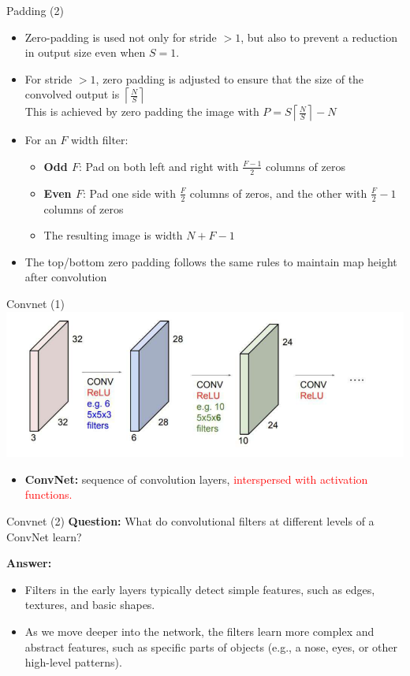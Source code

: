 \documentclass[default, aspectratio=169]{beamer}
\begin{document}
	\begin{frame}{Padding (2)}
		\begin{itemize}
			\item Zero-padding is used not only for stride $> 1$, but also to prevent a reduction in output size even when $S = 1$.
			
			\item For stride $> 1$, zero padding is adjusted to ensure that the size of the convolved output is $\left\lceil \frac{N}{S} \right\rceil$
			\\
			This is achieved by zero padding the image with  $ P = S\left\lceil \frac{N}{S} \right\rceil - N$
			
			\item For an $F$ width filter:
			\begin{itemize}
				\item \textbf{Odd $F$}: Pad on both left and right with $\frac{F-1}{2}$ columns of zeros
				\item \textbf{Even $F$}: Pad one side with $\frac{F}{2}$ columns of zeros, and the other with $\frac{F}{2} - 1$ columns of zeros
				\item The resulting image is width $N + F - 1$
			\end{itemize}
			\item The top/bottom zero padding follows the same rules to maintain map height after convolution
			
		\end{itemize}
	\end{frame}
	\begin{frame}{Convnet (1)}
		\centering
		\includegraphics[keepaspectratio, scale=0.7]{pic/convnet.png}
		\smallskip
		\begin{itemize}
			\item \textbf {ConvNet:} sequence of convolution layers, \textcolor{red}{interspersed with activation functions.}
		\end{itemize}
	\end{frame}
	\begin{frame}{Convnet (2)}
		\textbf{Question:}
		What do convolutional filters at different levels of a ConvNet learn?
		
		\bigskip
		
		\textbf{Answer:} 
		\begin{itemize}
			\item Filters in the early layers typically detect simple features, such as edges, textures, and basic shapes.
			\item As we move deeper into the network, the filters learn more complex and abstract features, such as specific parts of objects (e.g., a nose, eyes, or other high-level patterns).
		\end{itemize}
	\end{frame}
\end{document}
